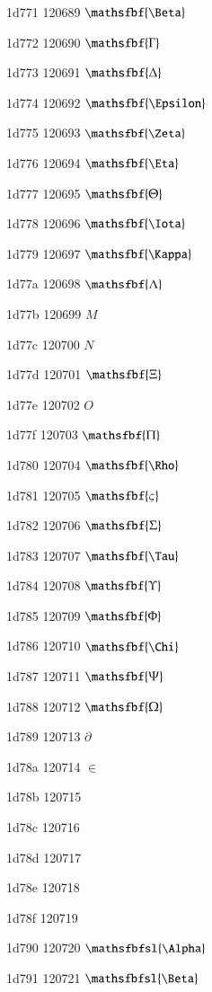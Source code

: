 \documentclass[11pt]{article}
\begin{document}
1d771 120689 \ensuremath{\mathsfbf{\Beta}}

1d772 120690 \ensuremath{\mathsfbf{\Gamma}}

1d773 120691 \ensuremath{\mathsfbf{\Delta}}

1d774 120692 \ensuremath{\mathsfbf{\Epsilon}}

1d775 120693 \ensuremath{\mathsfbf{\Zeta}}

1d776 120694 \ensuremath{\mathsfbf{\Eta}}

1d777 120695 \ensuremath{\mathsfbf{\Theta}}

1d778 120696 \ensuremath{\mathsfbf{\Iota}}

1d779 120697 \ensuremath{\mathsfbf{\Kappa}}

1d77a 120698 \ensuremath{\mathsfbf{\Lambda}}

1d77b 120699 \ensuremath{M}

1d77c 120700 \ensuremath{N}

1d77d 120701 \ensuremath{\mathsfbf{\Xi}}

1d77e 120702 \ensuremath{O}

1d77f 120703 \ensuremath{\mathsfbf{\Pi}}

1d780 120704 \ensuremath{\mathsfbf{\Rho}}

1d781 120705 \ensuremath{\mathsfbf{\varsigma}}

1d782 120706 \ensuremath{\mathsfbf{\Sigma}}

1d783 120707 \ensuremath{\mathsfbf{\Tau}}

1d784 120708 \ensuremath{\mathsfbf{\Upsilon}}

1d785 120709 \ensuremath{\mathsfbf{\Phi}}

1d786 120710 \ensuremath{\mathsfbf{\Chi}}

1d787 120711 \ensuremath{\mathsfbf{\Psi}}

1d788 120712 \ensuremath{\mathsfbf{\Omega}}

1d789 120713 \ensuremath{\partial}

1d78a 120714 \ensuremath{\in}

1d78b 120715 \mathsfbf{\vartheta}

1d78c 120716 \mathsfbf{\varkappa}

1d78d 120717 \mathsfbf{\phi}

1d78e 120718 \mathsfbf{\varrho}

1d78f 120719 \mathsfbf{\varpi}

1d790 120720 \ensuremath{\mathsfbfsl{\Alpha}}

1d791 120721 \ensuremath{\mathsfbfsl{\Beta}}
\end{document}
